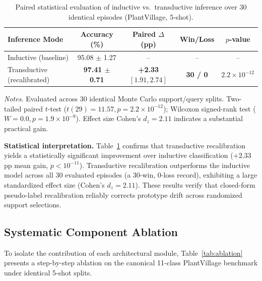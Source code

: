 \documentclass[preprint,12pt]{elsarticle}
\begin{document}
\begin{table}[htbp]
\caption{Paired statistical evaluation of inductive vs.\ transductive inference over 30 identical episodes (PlantVillage, 5-shot).}
\label{tab:paired_test}
\centering

\footnotesize
\setlength{\tabcolsep}{3pt}
\begin{tabular*}{\columnwidth}{@{\extracolsep{\fill}}lcccc}
\toprule
\textbf{Inference Mode} & \textbf{Accuracy (\%)} & \textbf{Paired $\Delta$ (pp)} & \textbf{Win/Loss} & \textbf{$p$-value} \\
\midrule
Inductive (baseline) & 95.08 $\pm$ 1.27 & -- & -- & -- \\
Transductive (recalibrated) & \textbf{97.41 $\pm$ 0.71} & \textbf{+2.33} $[1.91, 2.74]$ & \textbf{30 / 0} & $2.2\times 10^{-12}$ \\
\bottomrule
\end{tabular*}

\vspace{3pt}
\begin{minipage}{\columnwidth}
\footnotesize
\textit{Notes.} Evaluated across 30 identical Monte Carlo support/query splits. Two-tailed paired $t$-test ($t(29)=11.57, p=2.2\times 10^{-12}$); Wilcoxon signed-rank test ($W=0.0, p=1.9\times 10^{-9}$). Effect size Cohen's $d_z = 2.11$ indicates a substantial practical gain.
\end{minipage}
\end{table}

\textbf{Statistical interpretation.} Table~\ref{tab:paired_test} confirms that transductive recalibration yields a statistically significant improvement over inductive classification ($+2.33$\,pp mean gain, $p < 10^{-11}$). Transductive recalibration outperforms the inductive model across all 30 evaluated episodes (a 30-win, 0-loss record), exhibiting a large standardized effect size (Cohen's $d_z = 2.11$). These results verify that closed-form pseudo-label recalibration reliably corrects prototype drift across randomized support selections.

\subsection{Systematic Component Ablation}
\label{sec:ablation}

To isolate the contribution of each architectural module, Table~\ref{tab:ablation} presents a step-by-step ablation on the canonical 11-class PlantVillage benchmark under identical 5-shot splits.
\end{document}
